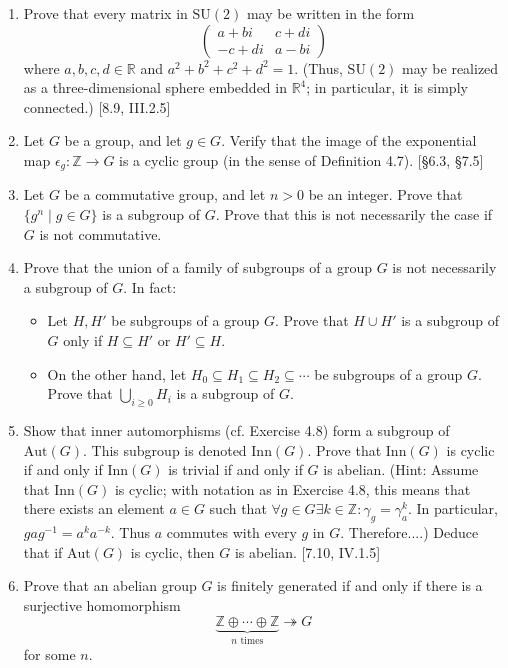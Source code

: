 \begin{enumerate}
    \item Prove that every matrix in $\text{SU}(2)$ may be written in the form
          \[ \begin{pmatrix} a+bi & c+di \\ -c+di & a-bi \end{pmatrix} \]
          where $a, b, c, d \in \mathbb{R}$ and $a^2+b^2+c^2+d^2=1$. (Thus, $\text{SU}(2)$ may be realized as a three-dimensional sphere embedded in $\mathbb{R}^4$; in particular, it is simply connected.) [8.9, III.2.5]

    \item Let $G$ be a group, and let $g \in G$. Verify that the image of the exponential map $\epsilon_g: \mathbb{Z} \to G$ is a cyclic group (in the sense of Definition 4.7). [\S6.3, \S7.5]

    \item Let $G$ be a commutative group, and let $n > 0$ be an integer. Prove that $\{g^n \mid g \in G\}$ is a subgroup of $G$. Prove that this is not necessarily the case if $G$ is not commutative.

    \item Prove that the union of a family of subgroups of a group $G$ is not necessarily a subgroup of $G$. In fact:
          \begin{itemize}
              \item Let $H, H'$ be subgroups of a group $G$. Prove that $H \cup H'$ is a subgroup of $G$ only if $H \subseteq H'$ or $H' \subseteq H$.
              \item On the other hand, let $H_0 \subseteq H_1 \subseteq H_2 \subseteq \cdots$ be subgroups of a group $G$. Prove that $\bigcup_{i \ge 0} H_i$ is a subgroup of $G$.
          \end{itemize}

    \item Show that inner automorphisms (cf. Exercise 4.8) form a subgroup of $\text{Aut}(G)$. This subgroup is denoted $\text{Inn}(G)$. Prove that $\text{Inn}(G)$ is cyclic if and only if $\text{Inn}(G)$ is trivial if and only if $G$ is abelian. (Hint: Assume that $\text{Inn}(G)$ is cyclic; with notation as in Exercise 4.8, this means that there exists an element $a \in G$ such that $\forall g \in G \exists k \in \mathbb{Z}: \gamma_g = \gamma_a^k$. In particular, $gag^{-1} = a^k a^{-k}$. Thus $a$ commutes with every $g$ in $G$. Therefore....) Deduce that if $\text{Aut}(G)$ is cyclic, then $G$ is abelian. [7.10, IV.1.5]

    \item Prove that an abelian group $G$ is finitely generated if and only if there is a surjective homomorphism
      \[
      \underbrace{\mathbb{Z} \oplus \cdots \oplus \mathbb{Z}}_{\text{$n$ times}}
      \twoheadrightarrow G
      \]
      for some $n$.


\end{enumerate}

